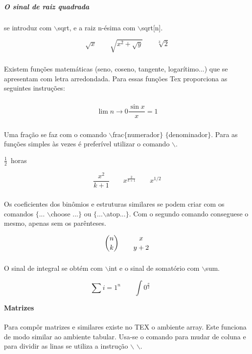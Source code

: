 \documentclass[a4paper, 12pt]{article} %
\begin{document}
\subparagraph{O sinal de raiz quadrada }se introduz com $\backslash$sqrt, e a raiz n-ésima com $\backslash$sqrt[n].

\begin{equation}
\sqrt{x} \qquad
\sqrt{x^{2}+\sqrt{y}} \qquad
\sqrt[3]{2}
\end{equation}

\subparagraph{} Existem funções matemáticas (seno, coseno, tangente, logarítimo...) que se apresentam com letra arredondada. Para essas funções Tex proporciona as seguintes instruções:

\subparagraph{}

\[ \lim {n \rightarrow 0}
\frac{\sin x}{x}=1\]

\subparagraph{} Uma fração se faz com o comando $\backslash$frac$\lbrace$numerador$\rbrace$ $\lbrace$denominador$\rbrace$. Para as funções simples às vezes é preferível utilizar o comando $\backslash$. 
\\
\begin{center}
$\frac{1}{2}$~horas
\end{center}
\begin{displaymath}
\frac{x^{2}}{k+1} \qquad
x^{\frac{2}{k+1}} \qquad x^{1/2}
\end{displaymath}

\subparagraph{} Os coeficientes dos binômios e estruturas similares se podem criar com os comandos $\lbrace$... $\backslash$choose ...$\rbrace$ ou $\lbrace$...$\backslash$atop...$\rbrace$. Com o segundo comando conseguese o mesmo, apenas sem os parênteses.

\begin{displaymath} %
{n \choose k}\qquad {x \atop y+2}
\end{displaymath}

\subparagraph{} O sinal de integral se obtém com $\backslash$int e o sinal de somatório com $\backslash$sum.

\begin{displaymath}  %
\sum {i=1}^{n} \qquad  %
\int {0}^{\frac{\pi}{2}} \qquad %
\end{displaymath}

\begin{flushleft} 
\textbf{Matrizes} %
\end{flushleft}

\paragraph{} Para compôr matrizes e similares existe no TEX o ambiente array. Este funciona de modo similar ao ambiente tabular. Usa-se o comando para mudar de coluna e para dividir as linas se utiliza a instrução $\backslash$ $\backslash$.
\end{document}
